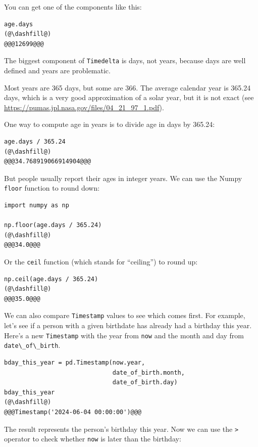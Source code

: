 You can get one of the components like this:

\begin{lstlisting}[]
age.days
(@\dashfill@)
@@@12699@@@
\end{lstlisting}

The biggest component of \passthrough{\lstinline!Timedelta!} is days,
not years, because days are well defined and years are problematic.

Most years are 365 days, but some are 366. The average calendar year is
365.24 days, which is a very good approximation of a solar year, but it
is not exact (see
\url{https://pumas.jpl.nasa.gov/files/04_21_97_1.pdf}).

One way to compute age in years is to divide age in days by 365.24:

\begin{lstlisting}[]
age.days / 365.24
(@\dashfill@)
@@@34.768919066914904@@@
\end{lstlisting}

But people usually report their ages in integer years. We can use the
Numpy \passthrough{\lstinline!floor!} function to round down:

\begin{lstlisting}[]
import numpy as np

np.floor(age.days / 365.24)
(@\dashfill@)
@@@34.0@@@
\end{lstlisting}

Or the \passthrough{\lstinline!ceil!} function (which stands for
``ceiling'') to round up:

\begin{lstlisting}[]
np.ceil(age.days / 365.24)
(@\dashfill@)
@@@35.0@@@
\end{lstlisting}

We can also compare \passthrough{\lstinline!Timestamp!} values to see
which comes first. For example, let's see if a person with a given
birthdate has already had a birthday this year. Here's a new
\passthrough{\lstinline!Timestamp!} with the year from
\passthrough{\lstinline!now!} and the month and day from
\passthrough{\lstinline!date\_of\_birth!}.

\begin{lstlisting}[]
bday_this_year = pd.Timestamp(now.year, 
                              date_of_birth.month, 
                              date_of_birth.day)
bday_this_year
(@\dashfill@)
@@@Timestamp('2024-06-04 00:00:00')@@@
\end{lstlisting}

The result represents the person's birthday this year. Now we can use
the \passthrough{\lstinline!>!} operator to check whether
\passthrough{\lstinline!now!} is later than the birthday:

